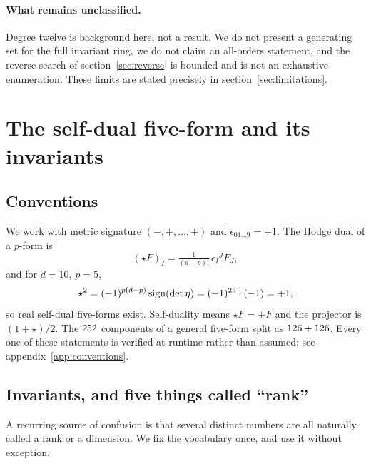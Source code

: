 \documentclass[11pt,a4paper]{article}
\begin{document}
\paragraph{What remains unclassified.} Degree twelve is background here, not a
result. We do not present a generating set for the full invariant ring, we do not
claim an all-orders statement, and the reverse search of
section~\ref{sec:reverse} is bounded and is not an exhaustive enumeration. These
limits are stated precisely in section~\ref{sec:limitations}.

\section{The self-dual five-form and its invariants}
\label{sec:setup}

\subsection{Conventions}

We work with metric signature $(-,+,\ldots,+)$ and
$\epsilon_{0 1 \ldots 9} = +1$. The Hodge dual of a $p$-form is
\begin{equation}
  (\star F)_{I} = \tfrac{1}{(d-p)!}\,\epsilon_{I}{}^{J} F_{J},
\end{equation}
and for $d=10$, $p=5$,
\begin{equation}
  \star^2 = (-1)^{p(d-p)}\,\mathrm{sign}(\det\eta)
          = (-1)^{25}\cdot(-1) = +1 ,
\end{equation}
so real self-dual five-forms exist. Self-duality means $\star F = +F$ and the
projector is $(1+\star)/2$. The $252$ components of a general
five-form split as $126 + 126$. Every one of these
statements is verified at runtime rather than assumed; see
appendix~\ref{app:conventions}.

\subsection{Invariants, and five things called ``rank''}
\label{sec:dictionary}

A recurring source of confusion is that several distinct numbers are all
naturally called a rank or a dimension. We fix the vocabulary once, and use it
without exception.
\end{document}
